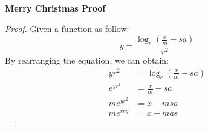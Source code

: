 \documentclass[11pt]{article}
\begin{document}
	\noindent \textbf{Merry Christmas Proof}
	
	\begin{proof}
	Given a function as follow:
	\[
	y = \frac{\log_e\left(\frac{x}{m} -sa\right)}{r^2}
	\]
	By rearranging the equation, we can obtain:
		\begin{align*}
			yr^2 &= \log_e \left(\frac{x}{m} -sa\right)\\
			e^{yr^2} &= \frac{x}{m} -sa\\
			me^{yr^2} &= x - msa\\
			me^{rry} &= x - mas
		\end{align*}
	\end{proof}	
	
\end{document}
